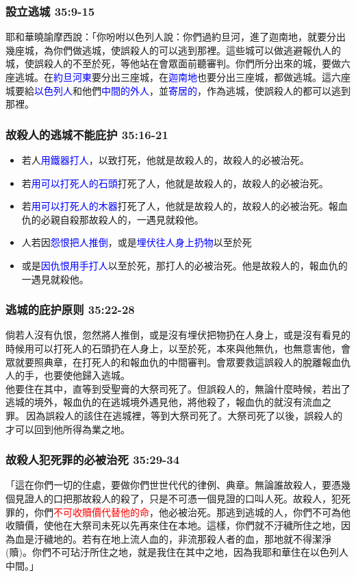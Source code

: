 \subsubsection{設立逃城  35:9-15} 
耶和華曉諭摩西說：「你吩咐以色列人說：你們過約旦河，進了迦南地，就要分出幾座城，為你們做逃城，使誤殺人的可以逃到那裡。這些城可以做逃避報仇人的城，使誤殺人的不至於死，等他站在會眾面前聽審判。你們所分出來的城，要做六座逃城。在\textcolor{blue}{約旦河東}要分出三座城，在\textcolor{blue}{迦南地}也要分出三座城，都做逃城。這六座城要給\textcolor{blue}{以色列人}和他們\textcolor{blue}{中間的外人}，並\textcolor{blue}{寄居的}，作為逃城，使誤殺人的都可以逃到那裡。

\subsubsection{故殺人的逃城不能庇护 35:16-21} 
\begin{itemize} 
\itemsep-.35em
\item 若人\textcolor{blue}{用鐵器打人}，以致打死，他就是故殺人的，故殺人的必被治死。 
\item 若\textcolor{blue}{用可以打死人的石頭}打死了人，他就是故殺人的，故殺人的必被治死。 
\item 若\textcolor{blue}{用可以打死人的木器}打死了人，他就是故殺人的，故殺人的必被治死。報血仇的必親自殺那故殺人的，一遇見就殺他。 
\item 人若因\textcolor{blue}{怨恨把人推倒}，或是\textcolor{blue}{埋伏往人身上扔物}以至於死
\item 或是\textcolor{blue}{因仇恨用手打人}以至於死，那打人的必被治死。他是故殺人的，報血仇的一遇見就殺他。
\end{itemize}

\subsubsection{逃城的庇护原则  35:22-28} 
倘若人沒有仇恨，忽然將人推倒，或是沒有埋伏把物扔在人身上，或是沒有看見的時候用可以打死人的石頭扔在人身上，以至於死，本來與他無仇，也無意害他，會眾就要照典章，在打死人的和報血仇的中間審判。會眾要救這誤殺人的脫離報血仇人的手，也要使他歸入逃城。\\
他要住在其中，直等到受聖膏的大祭司死了。但誤殺人的，無論什麼時候，若出了逃城的境外，報血仇的在逃城境外遇見他，將他殺了，報血仇的就沒有流血之罪。 因為誤殺人的該住在逃城裡，等到大祭司死了。大祭司死了以後，誤殺人的才可以回到他所得為業之地。

\subsubsection{故殺人犯死罪的必被治死  35:29-34} 
「這在你們一切的住處，要做你們世世代代的律例、典章。無論誰故殺人，要憑幾個見證人的口把那故殺人的殺了，只是不可憑一個見證的口叫人死。故殺人，犯死罪的，你們\textcolor{red}{不可收贖價代替他的命}，他必被治死。那逃到逃城的人，你們不可為他收贖價，使他在大祭司未死以先再來住在本地。這樣，你們就不汙穢所住之地，因為血是汙穢地的。若有在地上流人血的，非流那殺人者的血，那地就不得潔淨(贖)。你們不可玷汙所住之地，就是我住在其中之地，因為我耶和華住在以色列人中間。」
 	
